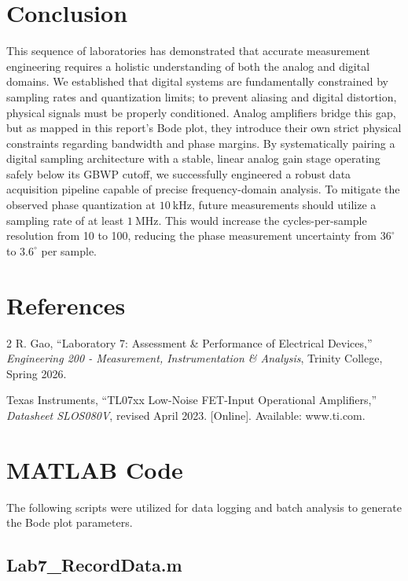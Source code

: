 \documentclass[11pt]{article}
\begin{document}
\section{Conclusion}
This sequence of laboratories has demonstrated that accurate measurement engineering requires a holistic understanding of both the analog and digital domains. We established that digital systems are fundamentally constrained by sampling rates and quantization limits; to prevent aliasing and digital distortion, physical signals must be properly conditioned. Analog amplifiers bridge this gap, but as mapped in this report's Bode plot, they introduce their own strict physical constraints regarding bandwidth and phase margins. By systematically pairing a digital sampling architecture with a stable, linear analog gain stage operating safely below its GBWP cutoff, we successfully engineered a robust data acquisition pipeline capable of precise frequency-domain analysis. To mitigate the observed phase quantization at $\SI{10}{\kilo\hertz}$, future measurements should utilize a sampling rate of at least $\SI{1}{\mega\hertz}$. This would increase the cycles-per-sample resolution from 10 to 100, reducing the phase measurement uncertainty from $36^\circ$ to $3.6^\circ$ per sample.

\section{References}
\begin{thebibliography}{2}
  R. Gao, ``Laboratory 7: Assessment \& Performance of Electrical Devices,'' \textit{Engineering 200 - Measurement, Instrumentation \& Analysis}, Trinity College, Spring 2026.

  Texas Instruments, ``TL07xx Low-Noise FET-Input Operational Amplifiers,'' \textit{Datasheet SLOS080V}, revised April 2023. [Online]. Available: www.ti.com.
\end{thebibliography}

\newpage
\appendix
\section{MATLAB Code}
The following scripts were utilized for data logging and batch analysis to generate the Bode plot parameters.

\subsection{Lab7\_RecordData.m}

\end{document}
